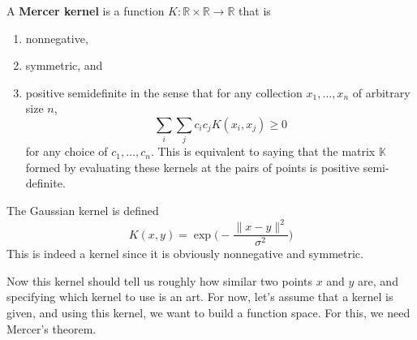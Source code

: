   \begin{definition}
    \label{def:mercer-kernels}
    A \textbf{Mercer kernel} is a function $K: \mathbb{R} \times \mathbb{R} \rightarrow \mathbb{R}$ that is 
    \begin{enumerate}
      \item nonnegative, 
      \item symmetric, and 
      \item positive semidefinite in the sense that for any collection $x_1, \ldots, x_n$ of arbitrary size $n$, 
      \begin{equation}
        \sum_i \sum_j c_i c_j K(x_i, x_j) \geq 0 
      \end{equation}
      for any choice of $c_1, \ldots, c_n$. This is equivalent to saying that the matrix $\mathbb{K}$ formed by evaluating these kernels at the pairs of points is positive semi-definite. 
    \end{enumerate}
  \end{definition}

  \begin{example}
    \label{ex:gaussian-kernel}
    The Gaussian kernel is defined 
    \begin{equation}
      K(x, y) = \exp \bigg( - \frac{\|x - y\|^2}{\sigma^2} \bigg)
    \end{equation}
    This is indeed a kernel since it is obviously nonnegative and symmetric. 
  \end{example} 

  Now this kernel should tell us roughly how similar two points $x$ and $y$ are, and specifying which kernel to use is an art. For now, let's assume that a kernel is given, and using this kernel, we want to build a function space. For this, we need Mercer's theorem. 

